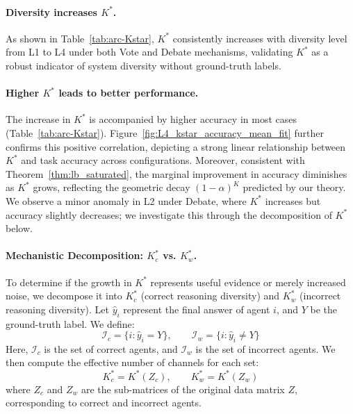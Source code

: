 \documentclass{article}
\theoremstyle{plain}
\theoremstyle{definition}
\theoremstyle{remark}
\begin{document}
\vspace{-0.2cm}
\paragraph{Diversity increases \(K^*\).}
As shown in Table~\ref{tab:arc-Kstar}, $K^*$ consistently increases with diversity level from L1 to L4 under both Vote and Debate mechanisms, validating $K^*$ as a robust indicator of system diversity without ground-truth labels.

\paragraph{Higher \(K^*\) leads to better performance.}
The increase in $K^*$ is accompanied by higher accuracy in most cases (Table~\ref{tab:arc-Kstar}). Figure~\ref{fig:L4_kstar_accuracy_mean_fit} further confirms this positive correlation, depicting a strong linear relationship between $K^*$ and task accuracy across configurations.
Moreover, consistent with Theorem~\ref{thm:lb_saturated}, the marginal improvement in accuracy diminishes as $K^*$ grows, reflecting the geometric decay $(1-\alpha)^K$ predicted by our theory. We observe a minor anomaly in L2 under Debate, where $K^*$ increases but accuracy slightly decreases; we investigate this through the decomposition of $K^*$ below.




\paragraph{Mechanistic Decomposition: \(K^*_c\) vs. \(K^*_w\).} 
To determine if the growth in \(K^*\) represents useful evidence or merely increased noise, we decompose it into \(K^*_c\) (correct reasoning diversity) and \(K^*_w\) (incorrect reasoning diversity). Let \(\hat{y}_i\) represent the final answer of agent \(i\), and \(Y\) be the ground-truth label. We define:
\vspace{-0.2cm}
\[
\mathcal{I}_c = \{i: \hat{y}_i = Y\}, \qquad \mathcal{I}_w = \{i: \hat{y}_i \neq Y\}
\]
Here, \(\mathcal{I}_c\) is the set of correct agents, and \(\mathcal{I}_w\) is the set of incorrect agents. We then compute the effective number of channels for each set:\vspace{-0.2cm}
\[
K^*_c = K^*(Z_c), \qquad K^*_w = K^*(Z_w)
\]
where \(Z_c\) and \(Z_w\) are the sub-matrices of the original data matrix \(Z\), corresponding to correct and incorrect agents.
\end{document}
